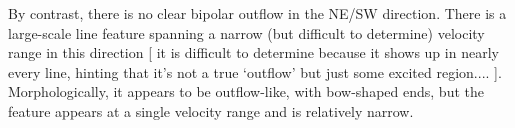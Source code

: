 \documentclass[twocolumn]{aastex61}
\begin{document}
By contrast, there is no clear bipolar outflow in the NE/SW direction.
There is a large-scale line feature spanning a narrow (but difficult to determine)
velocity range in this direction [ it is difficult to determine because it shows up
in nearly every line, hinting that it's not a true `outflow' but just some excited region.... ].
Morphologically, it appears to be outflow-like, with bow-shaped ends, but the feature appears
at a single velocity range and is relatively narrow.
\end{document}
